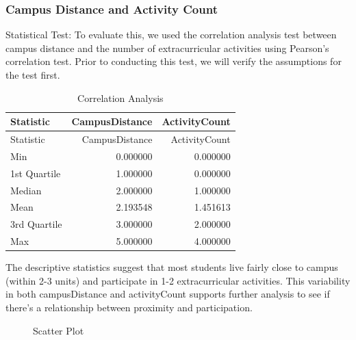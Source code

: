 \documentclass[
  letterpaper,
  DIV=11,
  numbers=noendperiod]{scrartcl}
\begin{document}
\subsubsection{Campus Distance and Activity
Count}\label{campus-distance-and-activity-count}

Statistical Test: To evaluate this, we used the correlation analysis
test between campus distance and the number of extracurricular
activities using Pearson's correlation test. Prior to conducting this
test, we will verify the assumptions for the test first.

\begin{longtable}[]{@{}lrr@{}}
\caption{Correlation Analysis}\tabularnewline
\toprule\noalign{}
Statistic & CampusDistance & ActivityCount \\
\midrule\noalign{}
\endfirsthead
\toprule\noalign{}
Statistic & CampusDistance & ActivityCount \\
\midrule\noalign{}
\endhead
\bottomrule\noalign{}
\endlastfoot
Min & 0.000000 & 0.000000 \\
1st Quartile & 1.000000 & 0.000000 \\
Median & 2.000000 & 1.000000 \\
Mean & 2.193548 & 1.451613 \\
3rd Quartile & 3.000000 & 2.000000 \\
Max & 5.000000 & 4.000000 \\
\end{longtable}

The descriptive statistics suggest that most students live fairly close
to campus (within 2-3 units) and participate in 1-2 extracurricular
activities. This variability in both campusDistance and activityCount
supports further analysis to see if there's a relationship between
proximity and participation.

\begin{figure}


\caption{\label{fig-plot1}Scatter Plot}

\end{figure}%
\end{document}

